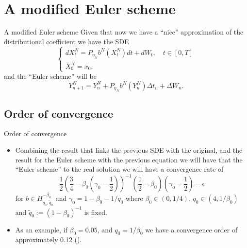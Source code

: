 \documentclass{beamer}
\begin{document}
\section{A modified Euler scheme}
\begin{frame}{A modified Euler scheme}
        Given that now we have a ``nice'' approximation of the distributional coefficient we have the SDE
        \begin{equation*}
				\begin{cases}
						dX^N_t
						= P_{\eta_{N}} b^N(X^N_t) dt
						+ dW_t,
						\quad
						t \in [0, T]
						\\
						X^N_0 = x_0,
				\end{cases}
		\end{equation*}
		and the {\color{red}``Euler scheme''} will be
		\begin{equation*}
				Y^{N}_{n+1} = Y^{N}_{n} + P_{\eta_{N}} b^{N}(Y^{N}_{n}) \Delta t_{n} + \Delta W_{n}.
		\end{equation*}
\end{frame}

\subsection{Order of convergence}
\begin{frame}{Order of convergence}
		\begin{itemize}
		\item Combining the result that links the previous SDE with the original, and the result for the Euler scheme with the previous equation we will have that the ``Euler scheme'' to the real solution we will have a convergence rate of
		\begin{equation*}
				\frac{1}{2}\left( \frac{3}{4} - \beta_0 \left( \gamma_0 - \frac{1}{2} \right) \right)^{-1} \left( \frac{1}{2} - \beta_0 \right) \left( \gamma_0 - \frac{1}{2} \right) - \epsilon
		\end{equation*}
		for
		$ b \in H^{-\beta_0}_{q_0, \tilde{q}_0} $
		and
		$ \gamma_0  = 1 - \beta_0 - 1/q_0$
		where
		$\beta_0 \in (0,1/4)$,
		$q_0 \in (4, 1/\beta_0)$
		and
		$\tilde{q}_0 := (1 - \beta_0)^{-1}$
		is fixed.

		\pause
		\item As an example, if
		$\beta_0 = 0.05$,
		and
		$q_0 = 1/\beta_0$
		we have a convergence order of approximately {\color{red}0.12}
		(\cite[]{de_angelis_numerical_2020}).
		\end{itemize}
\end{frame}
\end{document}
